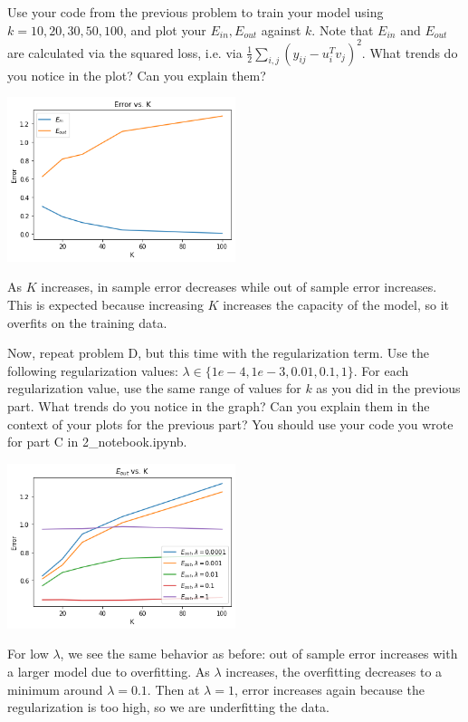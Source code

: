 \problem[5]Use your code from the previous problem to train your model using $k=10, 20, 30, 50, 100$, and plot your $E_{in}, E_{out}$ against $k$. Note that $E_{in}$ and $E_{out}$ are calculated via the squared loss, i.e. via $\frac{1}{2}\sum_{i,j} \left( y_{ij} - u_i^Tv_j\right)^2$. What trends do you notice in the plot? Can you explain them?

\begin{solution}
	
	\begin{center}
		\includegraphics[width=0.5\textwidth]{plots/2d.png}
	\end{center}

	As $K$ increases, in sample error decreases while out of sample error increases.
	This is expected because increasing $K$ increases the capacity of the model, so it overfits on the training data.
\end{solution}

\problem[5]Now, repeat problem D, but this time with the regularization term. Use the following regularization values: $\lambda \in \{1e-4, 1e-3, 0.01, 0.1, 1\}$. For each regularization value, use the same range of values for $k$ as you did in the previous part. What trends do you notice in the graph? Can you explain them in the context of your plots for the previous part? You should use your code you wrote for part C in 2_notebook.ipynb.

\begin{solution}

	\begin{center}
		\includegraphics[width=0.5\textwidth]{plots/2e.png}
	\end{center}

	For low $\lambda$, we see the same behavior as before: out of sample error increases with a larger model due to overfitting.
	As $\lambda$ increases, the overfitting decreases to a minimum around $\lambda = 0.1$.
	Then at $\lambda = 1$, error increases again because the regularization is too high, so we are underfitting the data.
\end{solution}

